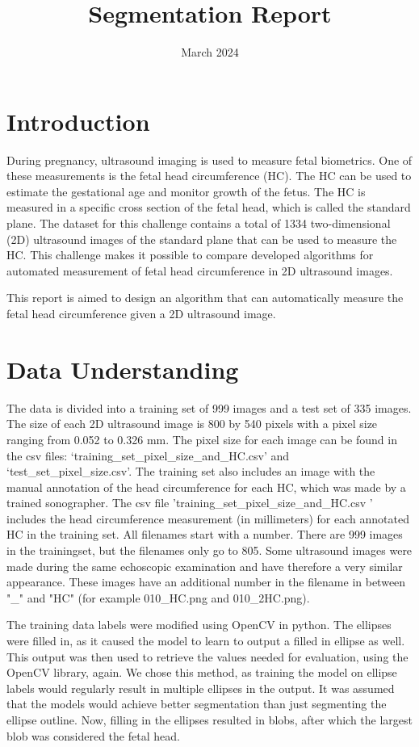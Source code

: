 \documentclass{article}
\title{Segmentation Report}
\date{March 2024}
\begin{document}
\maketitle

\section{Introduction}
During pregnancy, ultrasound imaging is used to measure fetal biometrics. One of these measurements is the fetal head circumference (HC). The HC can be used to estimate the gestational age and monitor growth of the fetus. The HC is measured in a specific cross section of the fetal head, which is called the standard plane. The dataset for this challenge contains a total of 1334 two-dimensional (2D) ultrasound images of the standard plane that can be used to measure the HC. This challenge makes it possible to compare developed algorithms for automated measurement of fetal head circumference in 2D ultrasound images. 

This report is aimed to design an algorithm that can automatically measure the fetal head circumference given a 2D ultrasound image.
\section{Data Understanding}
The data is divided into a training set of 999 images and a test set of 335 images. The size of each 2D ultrasound image is 800 by 540 pixels with a pixel size ranging from 0.052 to 0.326 mm. The pixel size for each image can be found in the csv files: ‘training\_set\_pixel\_size\_and\_HC.csv’ and ‘test\_set\_pixel\_size.csv’. The training set also includes an image with the manual annotation of the head circumference for each HC, which was made by a trained sonographer. The csv file 'training\_set\_pixel\_size\_and\_HC.csv ' includes the head circumference measurement (in millimeters) for each annotated HC in the training set. All filenames start with a number. There are 999 images in the trainingset, but the filenames only go to 805. Some ultrasound images were made during the same echoscopic examination and have therefore a very similar appearance. These images have an additional number in the filename in between "\_" and "HC" (for example 010\_HC.png and 010\_2HC.png).

The training data labels were modified using OpenCV in python. The ellipses were filled in, as it caused the model to learn to output a filled in ellipse as well. This output was then used to retrieve the values needed for evaluation, using the OpenCV library, again. We chose this method, as training the model on ellipse labels would regularly result in multiple ellipses in the output. It was assumed that the models would achieve better segmentation than just segmenting the ellipse outline. Now, filling in the ellipses resulted in blobs, after which the largest blob was considered the fetal head.
\end{document}
